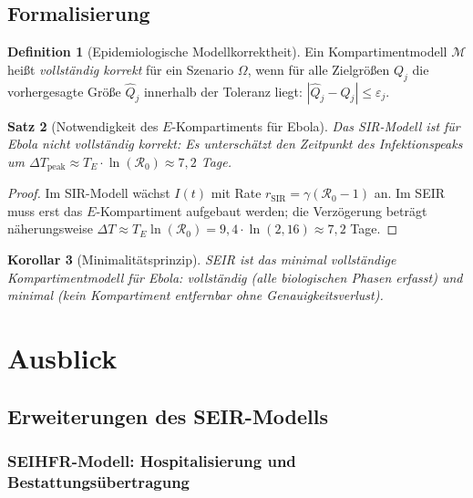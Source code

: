 ﻿\documentclass[12pt,a4paper]{article}
\theoremstyle{definition}
\newtheorem{definition}{Definition}[section]
\theoremstyle{plain}
\newtheorem{satz}[definition]{Satz}
\newtheorem{korollar}[definition]{Korollar}
\theoremstyle{remark}
\begin{document}
\subsection{Formalisierung}

\begin{definition}[Epidemiologische Modellkorrektheit]
Ein Kompartimentmodell $\mathcal{M}$ heißt \emph{vollständig korrekt} für ein
Szenario $\Omega$, wenn für alle Zielgrößen $Q_j$ die vorhergesagte Größe $\hat{Q}_j$
innerhalb der Toleranz liegt: $|\hat{Q}_j - Q_j| \leq \varepsilon_j$.
\end{definition}

\begin{satz}[Notwendigkeit des $E$-Kompartiments für Ebola]
\label{satz:e_notwendig}
Das SIR-Modell ist für Ebola nicht vollständig korrekt: Es unterschätzt den
Zeitpunkt des Infektionspeaks um
$\Delta T_{\text{peak}} \approx T_E \cdot \ln(\mathcal{R}_0) \approx 7{,}2$ Tage.
\end{satz}

\begin{proof}
Im SIR-Modell wächst $I(t)$ mit Rate $r_{\text{SIR}} = \gamma(\mathcal{R}_0-1)$ an.
Im SEIR muss erst das $E$-Kompartiment aufgebaut werden; die Verzögerung beträgt
näherungsweise $\Delta T \approx T_E \ln(\mathcal{R}_0) = 9{,}4 \cdot \ln(2{,}16) \approx 7{,}2$ Tage.
\end{proof}

\begin{korollar}[Minimalitätsprinzip]
SEIR ist das minimal vollständige Kompartimentmodell für Ebola: vollständig
(alle biologischen Phasen erfasst) und minimal (kein Kompartiment entfernbar ohne Genauigkeitsverlust).
\end{korollar}

\section{Ausblick}
\label{sec:ausblick}

\subsection{Erweiterungen des SEIR-Modells}

\subsubsection{SEIHFR-Modell: Hospitalisierung und Bestattungsübertragung}
\end{document}
